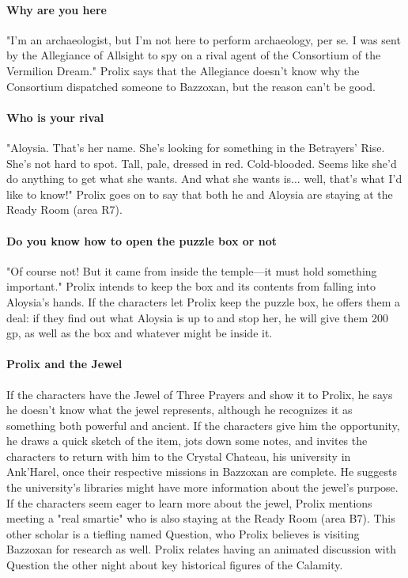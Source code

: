 \documentclass[10pt,a4,twoside,twocolumn,openany,nodeprecatedcode]{dndbook}
\begin{document}
\paragraph{Why are you here}
"I'm an archaeologist, but I'm not here to perform archaeology, per se. I was sent by the Allegiance of Allsight to spy on a rival agent of the Consortium of the Vermilion Dream." Prolix says that the Allegiance doesn't know why the Consortium dispatched someone to Bazzoxan, but the reason can't be good.
\paragraph{Who is your rival}
"Aloysia. That's her name. She's looking for something in the Betrayers' Rise. She's not hard to spot. Tall, pale, dressed in red. Cold-blooded. Seems like she'd do anything to get what she wants. And what she wants is... well, that's what I'd like to know!" Prolix goes on to say that both he and Aloysia are staying at the Ready Room (area R7).
\paragraph{Do you know how to open the puzzle box or not}
"Of course not! But it came from inside the temple—it must hold something important." Prolix intends to keep the box and its contents from falling into Aloysia's hands.
If the characters let Prolix keep the puzzle box, he offers them a deal: if they find out what Aloysia is up to and stop her, he will give them 200 gp, as well as the box and whatever might be inside it.
\paragraph{Prolix and the Jewel}
If the characters have the Jewel of Three Prayers and show it to Prolix, he says he doesn't know what the jewel represents, although he recognizes it as something both powerful and ancient. If the characters give him the opportunity, he draws a quick sketch of the item, jots down some notes, and invites the characters to return with him to the Crystal Chateau, his university in Ank'Harel, once their respective missions in Bazzoxan are complete. He suggests the university's libraries might have more information about the jewel's purpose.
If the characters seem eager to learn more about the jewel, Prolix mentions meeting a "real smartie" who is also staying at the Ready Room (area B7). This other scholar is a tiefling named Question, who Prolix believes is visiting Bazzoxan for research as well. Prolix relates having an animated discussion with Question the other night about key historical figures of the Calamity.
\end{document}
